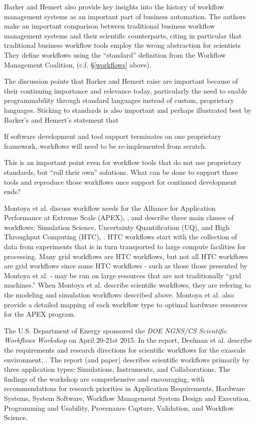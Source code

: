 Barker and Hemert also provide key insights into the history of workflow
management systems as an important part of business automation. The authors make
an important comparison between traditional business workflow management systems
and their scientific counterparts, citing in particular that traditional
business workflow tools employ the wrong abstraction for scientists They define
workflows using the ``standard'' definition from the Workflow Management
Coalition, (c.f. \S \ref{workflows} above).

The discussion points that Barker and Hemert raise are important because of
their continuing importance and relevance today, particularly the need to enable
programmability through standard languages instead of custom, proprietary
languages. Sticking to standards is also important and perhaps illustrated best
by Barker's and Hemert's statement that

\begin{displayquote} If software development and tool support terminates on one
proprietary framework, workflows will need to be re-implemented from scratch.
\end{displayquote}

This is an important point even for workflow tools that do not use proprietary
standards, but ``roll their own'' solutions. What can be done to support those
tools and reproduce those workflows once support for continued development ends?

Montoya et al. discuss workflow needs for the Alliance for Application
Performance at Extreme Scale (APEX), \cite{nersc_apex_2016}, and describe three
main classes of workflows: Simulation Science, Uncertainty Quantification (UQ),
and High Throughput Computing (HTC), \cite{montoya_apex_2016}.  HTC workflows
start with the collection of data from experiments that is in turn transported
to large compute facilities for processing. Many grid workflows are HTC
workflows, but not all HTC workflows are grid workflows since some HTC workflows
- such as those those presented by Montoya et al. - may be run on large
resources that are not traditionally ``grid machines.'' When Montoya et al.
describe scientific workflows, they are refering to the modeling and simulation
workflows described above. Montoya et al. also provide a detailed mapping of
each workflow type to optimal hardware resources for the APEX program.

The U.S. Department of Energy sponsored the \emph{DOE NGNS/CS Scientific
Workflows Workshop} on April 20-21st 2015. In the report, Deelman et al.
describe the requirements and research directions for scientific workflows for
the exascale environment, \cite{deelman_future_2015}\cite{deelman_future_2017}.
The report (and paper) describes scientific workflows primarily by three
application types: Simulations, Instruments, and Collaborations. The findings of
the workshop are comprehensive and encouraging, with recommendations for
research priorities in Application Requirements, Hardware Systems, System
Software, Workflow Management System Design and Execution, Programming and
Usability, Provenance Capture, Validation, and Workflow Science.


